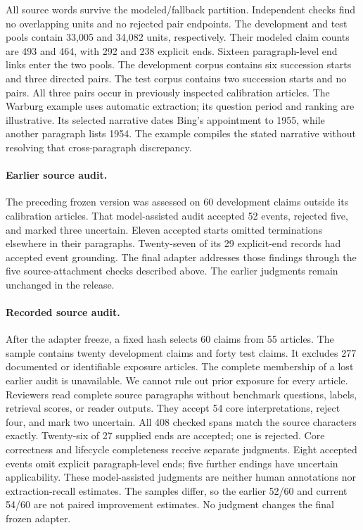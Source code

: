 All source words survive the modeled/fallback partition.
Independent checks find no overlapping units and no rejected pair endpoints.
The development and test pools contain 33,005 and 34,082 units, respectively.
Their modeled claim counts are 493 and 464, with 292 and 238 explicit ends.
Sixteen paragraph-level end links enter the two pools.
The development corpus contains six succession starts and three directed pairs.
The test corpus contains two succession starts and no pairs.
All three pairs occur in previously inspected calibration articles.
The Warburg example uses automatic extraction; its question period and ranking are illustrative.
Its selected narrative dates Bing's appointment to 1955, while another paragraph lists 1954.
The example compiles the stated narrative without resolving that cross-paragraph discrepancy.

\paragraph{Earlier source audit.}
The preceding frozen version was assessed on 60 development claims outside its calibration articles.
That model-assisted audit accepted 52 events, rejected five, and marked three uncertain.
Eleven accepted starts omitted terminations elsewhere in their paragraphs.
Twenty-seven of its 29 explicit-end records had accepted event grounding.
The final adapter addresses those findings through the five source-attachment checks described above.
The earlier judgments remain unchanged in the release.

\paragraph{Recorded source audit.}
After the adapter freeze, a fixed hash selects 60 claims from 55 articles.
The sample contains twenty development claims and forty test claims.
It excludes 277 documented or identifiable exposure articles.
The complete membership of a lost earlier audit is unavailable.
We cannot rule out prior exposure for every article.
Reviewers read complete source paragraphs without benchmark questions, labels, retrieval scores, or reader outputs.
They accept 54 core interpretations, reject four, and mark two uncertain.
All 408 checked spans match the source characters exactly.
Twenty-six of 27 supplied ends are accepted; one is rejected.
Core correctness and lifecycle completeness receive separate judgments.
Eight accepted events omit explicit paragraph-level ends; five further endings have uncertain applicability.
These model-assisted judgments are neither human annotations nor extraction-recall estimates.
The samples differ, so the earlier 52/60 and current 54/60 are not paired improvement estimates.
No judgment changes the final frozen adapter.

